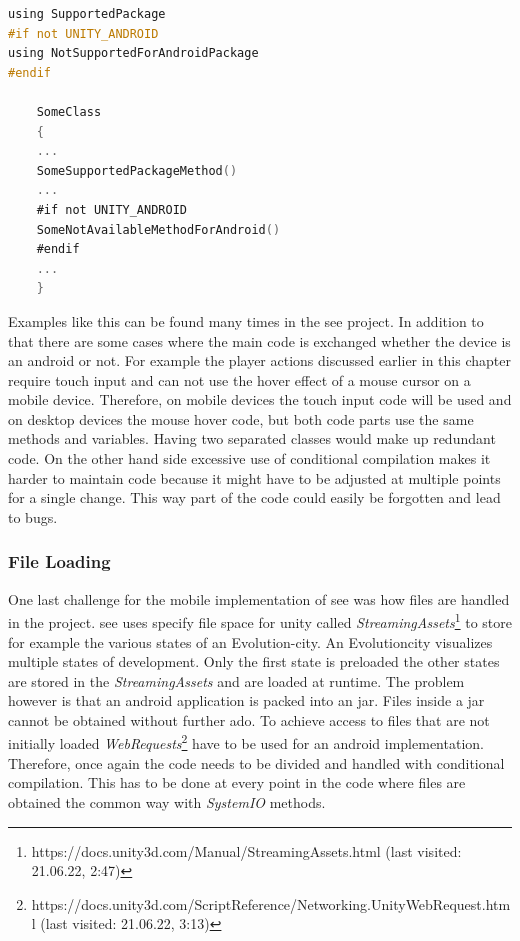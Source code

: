 \begin{minipage}{\linewidth}

\begin{lstlisting}[language=C]
using SupportedPackage
#if not UNITY_ANDROID
using NotSupportedForAndroidPackage
#endif 

    SomeClass
    {
    ...
    SomeSupportedPackageMethod()
    ...
    #if not UNITY_ANDROID
    SomeNotAvailableMethodForAndroid()
    #endif
    ...
    }
\end{lstlisting}

\end{minipage}

Examples like this can be found many times in the \gls{see} project. 
In addition to that there are some cases where the main code is exchanged whether the device is an \gls{android} or not.
For example the player actions discussed earlier in this chapter require touch input and can not use the hover effect of a mouse cursor on a mobile device.
Therefore, on mobile devices the touch input code will be used and on desktop devices the mouse hover code, but both code parts use the same methods and variables.
Having two separated classes would make up redundant code. 
On the other hand side excessive use of conditional compilation makes it harder to maintain code because it might have to be adjusted at multiple points for a single change.
This way part of the code could easily be forgotten and lead to bugs.

\subsubsection{File Loading}
One last challenge for the mobile implementation of \gls{see} was how files are handled in the project.
\gls{see} uses specify file space for \gls{unity} called \textit{StreamingAssets}\footnote{https://docs.unity3d.com/Manual/StreamingAssets.html (last visited: 21.06.22, 2:47)} to store for example the various states of an Evolution-\gls{city}.
An Evolution\gls{city} visualizes multiple states of development.
Only the first state is preloaded the other states are stored in the \textit{StreamingAssets} and are loaded at runtime. 
The problem however is that an \gls{android} application is packed into an \gls{jar}.
Files inside a \gls{jar} cannot be obtained without further ado.
To achieve access to files that are not initially loaded \textit{WebRequests}\footnote{https://docs.unity3d.com/ScriptReference/Networking.UnityWebRequest.html (last visited: 21.06.22, 3:13)} have to be used for an \gls{android} implementation. 
Therefore, once again the code needs to be divided and handled with conditional compilation.
This has to be done at every point in the code where files are obtained the common way with \textit{SystemIO} methods. 


